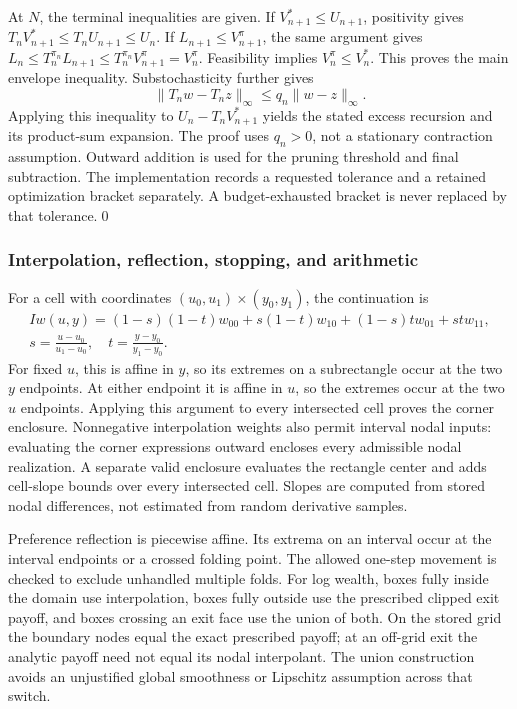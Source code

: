 At $N$, the terminal inequalities are given. If $V_{n+1}^*\leq U_{n+1}$, positivity gives $T_nV_{n+1}^*\leq T_nU_{n+1}\leq U_n$. If $L_{n+1}\leq V_{n+1}^{\pi}$, the same argument gives $L_n\leq T_n^{\pi_n}L_{n+1}\leq T_n^{\pi_n}V_{n+1}^{\pi}=V_n^{\pi}$. Feasibility implies $V_n^{\pi}\leq V_n^*$. This proves the main envelope inequality. Substochasticity further gives
\[
 \|T_nw-T_nz\|_\infty\leq q_n\|w-z\|_\infty.
\]
Applying this inequality to $U_n-T_nV_{n+1}^*$ yields the stated excess recursion and its product-sum expansion. The proof uses $q_n>0$, not a stationary contraction assumption. Outward addition is used for the pruning threshold and final subtraction. The implementation records a requested tolerance and a retained optimization bracket separately. A budget-exhausted bracket is never replaced by that tolerance.\qed

\subsubsection{Interpolation, reflection, stopping, and arithmetic}
For a cell with coordinates $(u_0,u_1)\times(y_0,y_1)$, the continuation is
\[
 \begin{gathered}
 Iw(u,y)=(1-s)(1-t)w_{00}+s(1-t)w_{10}+(1-s)tw_{01}+st w_{11},\\
 s=\frac{u-u_0}{u_1-u_0},\quad t=\frac{y-y_0}{y_1-y_0}.
\end{gathered}
\]
For fixed $u$, this is affine in $y$, so its extremes on a subrectangle occur at the two $y$ endpoints. At either endpoint it is affine in $u$, so the extremes occur at the two $u$ endpoints. Applying this argument to every intersected cell proves the corner enclosure. Nonnegative interpolation weights also permit interval nodal inputs: evaluating the corner expressions outward encloses every admissible nodal realization. A separate valid enclosure evaluates the rectangle center and adds cell-slope bounds over every intersected cell. Slopes are computed from stored nodal differences, not estimated from random derivative samples.

Preference reflection is piecewise affine. Its extrema on an interval occur at the interval endpoints or a crossed folding point. The allowed one-step movement is checked to exclude unhandled multiple folds. For log wealth, boxes fully inside the domain use interpolation, boxes fully outside use the prescribed clipped exit payoff, and boxes crossing an exit face use the union of both. On the stored grid the boundary nodes equal the exact prescribed payoff; at an off-grid exit the analytic payoff need not equal its nodal interpolant. The union construction avoids an unjustified global smoothness or Lipschitz assumption across that switch.

